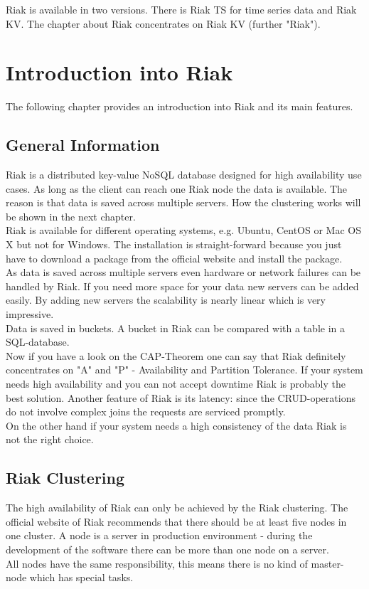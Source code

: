 Riak is available in two versions. There is Riak TS for time series data and Riak KV. The chapter about Riak concentrates on Riak KV (further "Riak").
\section{Introduction into Riak}
The following chapter provides an introduction into Riak and its main features. 
\subsection{General Information}
Riak is a distributed key-value NoSQL database designed for high availability use cases. As long as the client can reach one Riak node the data is available. The reason is that data is saved across multiple servers. How the clustering works will be shown in the next chapter. \cite{Basho.06.04.2017}
\\
Riak is available for different operating systems, e.g. Ubuntu, CentOS or Mac OS X but not for Windows. The installation is straight-forward because you just have to download a package from the official website and install the package. \cite{Basho.06.04.2017}
\\ 
As data is saved across multiple servers even hardware or network failures can be handled by Riak. If you need more space for your data new servers can be added easily. By adding new servers the scalability is nearly linear which is very impressive. \cite{Basho.06.04.2017}
\\
Data is saved in buckets. A bucket in Riak can be compared with a table in a SQL-database. \cite{Basho.06.04.2017}
\\ 
Now if you have a look on the CAP-Theorem one can say that Riak definitely concentrates on "A" and "P" - Availability and Partition Tolerance. If your system needs high availability and you can not accept downtime Riak is probably the best solution. Another feature of Riak is its latency: since the CRUD-operations do not involve complex joins the requests are serviced promptly. \cite{Basho.06.04.2017}
\\
On the other hand if your system needs a high consistency of the data Riak is not the right choice. \cite{Basho.06.04.2017}
\subsection{Riak Clustering}
The high availability of Riak can only be achieved by the Riak clustering. The official website of Riak recommends that there should be at least five nodes in one cluster. A node is a server in production environment - during the development of the software there can be more than one node on a server. \cite{Basho.06.04.2017}
\\
All nodes have the same responsibility, this means there is no kind of master-node which has special tasks. \cite{Basho.06.04.2017}

